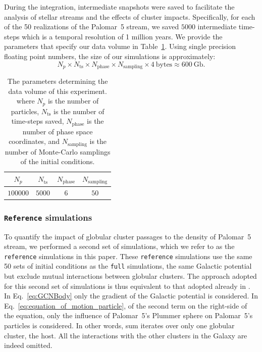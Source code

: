 \documentclass[draft]{aa}
\begin{document}
      During the integration, intermediate snapshots were saved to facilitate the analysis of stellar streams and the effects of cluster impacts. Specifically, for each of the 50 realizations of the Palomar~5 stream, we saved $5000$ intermediate time-steps which is a temporal resolution of 1 million years. We provide the parameters that specify our data volume in Table~\ref{tab:data_volume}. Using single precision floating point numbers, the size of our simulations is approximately:
    \begin{equation} \label{eq:data_volume_estimate}
      N_p \times N_{\textrm{ts}}\times N_{\textrm{phase}}\times N_{\textrm{sampling}} \times 4~\textrm{bytes}\approx 600~\textrm{Gb}.
    \end{equation}

    \begin{table}[h]
      \centering
      \begin{tabular}{|c|c|c|c|}
          \hline
          $N_p$ & $N_{\textrm{ts}}$ & $N_{\textrm{phase}}$ & $N_{\textrm{sampling}}$ \\
          \hline
          $100000$ & $5000$ & $6$ & $50$ \\
          \hline
      \end{tabular}
      \caption{The parameters determining the data volume of this experiment. where $N_p$  is the number of particles, $N_{\textrm{ts}}$ is the number of time-steps saved, $N_{\textrm{phase}}$ is the number of phase space coordinates, and $N_{\textrm{sampling}}$ is the number of Monte-Carlo samplings of the initial conditions.}
      \label{tab:data_volume}
    \end{table}

  \subsubsection*{ \texttt{Reference} simulations}

    To quantify the impact of globular cluster passages to the density of Palomar~5 stream, we performed a second set of simulations, which we refer to as the \texttt{reference} simulations in this paper.  These \texttt{reference} simulations use the same 50 sets of initial conditions as the \texttt{full} simulations, the same Galactic potential but exclude mutual interactions between globular clusters. The approach adopted for this second set of simulations is thus equivalent to that adopted already in \citet{2023A&A...673A..44F}. In Eq.~\ref{eq:GCNBody} only the gradient of the Galactic potential  is considered. In Eq.~\ref{eq:equation_of_motion_particle}, of the second term on the right-side of the equation, only the influence of Palomar~5's Plummer sphere on Palomar~5's particles is considered. In other words, sum iterates over only one globular cluster, the host. All the interactions with the other clusters in the Galaxy are indeed omitted.
\end{document}
